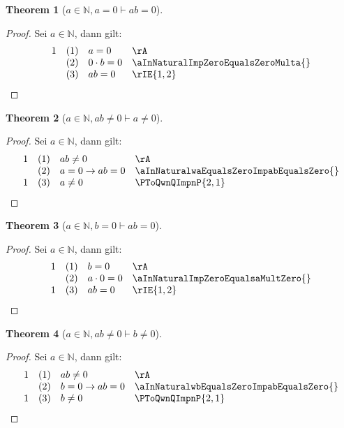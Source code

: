 \documentclass{book}
\theoremstyle{plain}
\newtheorem{theorem}{Theorem}
\theoremstyle{remark}
\theoremstyle{definition}
\begin{document}
\label{aInNaturalwaEqualsZeroImpabEqualsZero}
\begin{theorem}[\(a\in\mathbb{N},a=0\vdash ab=0\)]
\end{theorem}
\begin{proof}
    Sei \(a\in\mathbb{N}\), dann gilt:
        \[
	\begin{array}{llll}
              1  &  (1) & a=0 & \rA \\
                 &  (2) & 0\cdot b=0 & \aInNaturalImpZeroEqualsZeroMulta{} \\
                 &  (3) & ab=0 & \rIE{1,2} \\
	\end{array}
	\]
\end{proof}

\label{aInNaturalwabNotEqualsZeroImpaNotEqualsZero}
\begin{theorem}[\(a\in\mathbb{N},ab\neq 0\vdash a\neq 0\)]
\end{theorem}
\begin{proof}
    Sei \(a\in\mathbb{N}\), dann gilt:
        \[
	\begin{array}{llll}
              1  &  (1) & ab\neq 0 & \rA \\
                 &  (2) & a=0\rightarrow ab=0 & \aInNaturalwaEqualsZeroImpabEqualsZero{} \\
              1  &  (3) & a\neq 0 & \PToQwnQImpnP{2,1} \\
	\end{array}
	\]
\end{proof}

\label{aInNaturalwbEqualsZeroImpabEqualsZero}
\begin{theorem}[\(a\in\mathbb{N},b=0\vdash ab=0\)]
\end{theorem}
\begin{proof}
    Sei \(a\in\mathbb{N}\), dann gilt:
        \[
	\begin{array}{llll}
              1  &  (1) & b=0 & \rA \\
                 &  (2) & a\cdot 0=0 & \aInNaturalImpZeroEqualsaMultZero{} \\
              1  &  (3) & ab=0 & \rIE{1,2} \\
	\end{array}
	\]
\end{proof}

\label{aInNaturalwabNotEqualsZeroImpbNotEqualsZero}
\begin{theorem}[\(a\in\mathbb{N},ab\neq 0\vdash b\neq 0\)]
\end{theorem}
\begin{proof}
    Sei \(a\in\mathbb{N}\), dann gilt:
        \[
	\begin{array}{llll}
              1  &  (1) & ab\neq 0 & \rA \\
                 &  (2) & b=0\rightarrow ab=0 & \aInNaturalwbEqualsZeroImpabEqualsZero{} \\
              1  &  (3) & b\neq 0 & \PToQwnQImpnP{2,1} \\
	\end{array}
	\]
\end{proof}
\end{document}
